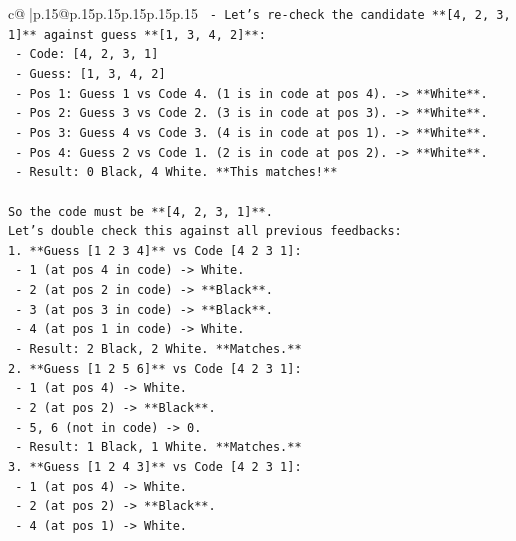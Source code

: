 \documentclass{article}
\begin{document}
{\begin{supertabular}{c@{$\;$}|p{.15\linewidth}@{}p{.15\linewidth}p{.15\linewidth}p{.15\linewidth}p{.15\linewidth}p{.15\linewidth}}
{{{\texttt{    {-} Let's re{-}check the candidate **{[}4, 2, 3, 1{]}** against guess **{[}1, 3, 4, 2{]}**:} \\
\texttt{        {-} Code: {[}4, 2, 3, 1{]}} \\
\texttt{        {-} Guess: {[}1, 3, 4, 2{]}} \\
\texttt{        {-} Pos 1: Guess 1 vs Code 4. (1 is in code at pos 4). {-}> **White**.} \\
\texttt{        {-} Pos 2: Guess 3 vs Code 2. (3 is in code at pos 3). {-}> **White**.} \\
\texttt{        {-} Pos 3: Guess 4 vs Code 3. (4 is in code at pos 1). {-}> **White**.} \\
\texttt{        {-} Pos 4: Guess 2 vs Code 1. (2 is in code at pos 2). {-}> **White**.} \\
\texttt{        {-} Result: 0 Black, 4 White. **This matches!**} \\
\\ 
\texttt{So the code must be **{[}4, 2, 3, 1{]}**.} \\
\texttt{Let's double check this against all previous feedbacks:} \\
\texttt{1.  **Guess {[}1 2 3 4{]}** vs Code {[}4 2 3 1{]}:} \\
\texttt{    {-} 1 (at pos 4 in code) {-}> White.} \\
\texttt{    {-} 2 (at pos 2 in code) {-}> **Black**.} \\
\texttt{    {-} 3 (at pos 3 in code) {-}> **Black**.} \\
\texttt{    {-} 4 (at pos 1 in code) {-}> White.} \\
\texttt{    {-} Result: 2 Black, 2 White. **Matches.**} \\
\texttt{2.  **Guess {[}1 2 5 6{]}** vs Code {[}4 2 3 1{]}:} \\
\texttt{    {-} 1 (at pos 4) {-}> White.} \\
\texttt{    {-} 2 (at pos 2) {-}> **Black**.} \\
\texttt{    {-} 5, 6 (not in code) {-}> 0.} \\
\texttt{    {-} Result: 1 Black, 1 White. **Matches.**} \\
\texttt{3.  **Guess {[}1 2 4 3{]}** vs Code {[}4 2 3 1{]}:} \\
\texttt{    {-} 1 (at pos 4) {-}> White.} \\
\texttt{    {-} 2 (at pos 2) {-}> **Black**.} \\
\texttt{    {-} 4 (at pos 1) {-}> White.} \\
}}}
\end{supertabular}}
\end{document}
